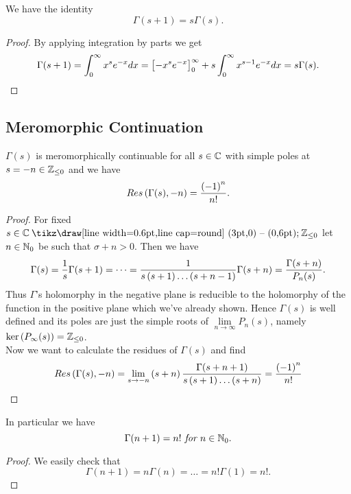 \begin{theorem}
	We have the identity
\begin{equation*}
	\Gamma(s + 1) = s \Gamma(s).
\end{equation*}
\end{theorem}
\begin{proof}
	By applying integration by parts we get
\begin{equation*}
	\Gamma(s + 1) = \int _0 ^\infty x^{s} e^{-x} dx =\left[-x^s e^{-x}\right] _0 ^\infty + s \int _0 ^\infty x^{s - 1} e^{-x} dx = s\Gamma(s).
\end{equation*}
\end{proof}


\subsection{Meromorphic Continuation}


\begin{theorem}
	$\Gamma(s)$ is meromorphically continuable for all $s \in \mathbb{C}$ with simple poles at $s = -n\in \mathbb{Z} _{\leq 0}$ and we have
\begin{equation*}
	Res\left(\Gamma(s), -n\right) = \frac{\left(-1\right)^n}{n!}.
\end{equation*}
\end{theorem}
\begin{proof}
	For fixed $s \in \field{C} \mysetminus \field{Z}_{\leq 0}$ let $n \in \mathbb{N}_0$ be such that $\sigma + n > 0$. Then we have
\begin{equation*}
	\Gamma(s) = \frac{1}{s} \Gamma(s + 1) = \dots = \frac{1}{s \left(s + 1\right) \dots \left(s + n - 1\right)} \Gamma(s + n) = \frac{\Gamma(s + n)}{P_n(s)}.
\end{equation*}
	Thus $\Gamma$'s holomorphy in the negative plane is reducible to the holomorphy of the function in the positive plane which we've already shown. Hence $\Gamma(s)$ is well defined and its poles are just the simple roots of $\lim\limits_{n \to \infty} P_n(s)$, namely $\ker\left(P_\infty(s)\right) = \mathbb{Z}_{\leq 0}$. \\
	Now we want to calculate the residues of $\Gamma(s)$ and find
\begin{equation*}
	Res\left(\Gamma(s), -n\right) = \lim\limits_{s \to -n} \left(s + n\right) \frac{\Gamma(s + n + 1)}{s \left(s + 1\right) \dots \left(s + n\right)} = \frac{\left(-1\right)^n}{n!}
\end{equation*}
\end{proof}


\begin{lemma}
	In particular we have
\begin{equation*}
	\Gamma(n + 1) = n! \textit{ for } n \in \mathbb{N}_0.
\end{equation*}
\end{lemma}
\begin{proof}
	We easily check that
\begin{equation*}
	\Gamma(n + 1) = n \Gamma(n) = \dots = n! \Gamma(1) = n!.
\end{equation*}
\end{proof}


